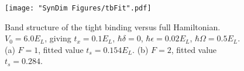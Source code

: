 \begin{figure}
	\texttt{[image: "SynDim Figures/tbFit".pdf]}
\caption[Band structure of the tight binding versus full Hamiltonian]{Band structure of the tight binding versus full Hamiltonian. $V_0=6.0 E_L$, giving $t_x=0.1 E_L$, $\hbar\delta=0$, $\hbar\epsilon=0.02 E_L$, $\hbar\Omega=0.5 E_L$. (a) $F=1$, fitted value $t_s=0.154 E_L$. (b) $F=2$, fitted value $t_s=0.284$. }
\label{fig:tbFit}
\end{figure}
%
%
%

